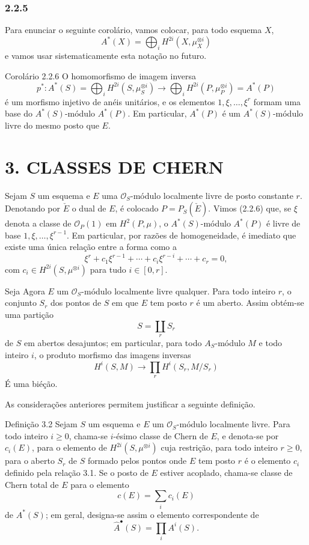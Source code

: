 \subsubsection*{2.2.5}
Para enunciar o seguinte corolário, vamos colocar, para todo esquema $X$,
\[
A^*(X)=\bigoplus_i H^{2i}(X,\mu_X^{\otimes i})
\]
e vamos usar sistematicamente esta notação no futuro.

\begin{statement}{Corolário 2.2.6}
O homomorfismo de imagem inversa
\[
p^*:A^*(S)=\bigoplus_i H^{2i}(S,\mu_S^{\otimes i})
\longrightarrow
\bigoplus_i H^{2i}(P,\mu_P^{\otimes i})=A^*(P)
\]
é um morfismo injetivo de anéis unitários, e os elementos $1,\xi,\ldots,\xi^r$ formam uma base do $A^*(S)$-módulo $A^*(P)$. Em particular, $A^*(P)$ é um $A^*(S)$-módulo livre do mesmo posto que $E$.
\end{statement}

\section*{3. CLASSES DE CHERN}

Sejam $S$ um esquema e $E$ uma $\mathcal O_S$-módulo localmente livre de posto constante $r$. Denotando por $\check E$ o dual de $E$, é colocado $P=P_S(\check E)$. Vimos (2.2.6) que, se $\xi$ denota a classe de $\mathcal O_P(1)$ em $H^2(P,\mu)$, o $A^*(S)$-módulo $A^*(P)$ é livre de base $1,\xi,\ldots,\xi^{r-1}$. Em particular, por razões de homogeneidade, é imediato que existe uma única relação entre a forma como a
\[
\xi^r+c_1\xi^{r-1}+\cdots+c_i\xi^{r-i}+\cdots+c_r=0,
\tag*{3.1.}
\]
com $c_i\in H^{2i}(S,\mu^{\otimes i})$ para tudo $i\in[0,r]$.

Seja Agora $E$ um $\mathcal O_S$-módulo localmente livre qualquer. Para todo inteiro $r$, o conjunto $S_r$ dos pontos de $S$ em que $E$ tem posto $r$ é um aberto. Assim obtém-se uma partição
\[
S=\coprod_r S_r
\]
de $S$ em abertos desajuntos; em particular, para todo $A_S$-módulo $M$ e todo inteiro $i$, o produto morfismo das imagens inversas
\[
H^i(S,M)\longrightarrow \prod_r H^i(S_r,M/S_r)
\]
É uma biéção.

As considerações anteriores permitem justificar a seguinte definição.

\begin{statement}{Definição 3.2}
Sejam $S$ um esquema e $E$ um $\mathcal O_S$-módulo localmente livre. Para todo inteiro $i\ge0$, chama-se $i$-ésimo classe de Chern de $E$, e denota-se por $c_i(E)$, para o elemento de $H^{2i}(S,\mu^{\otimes i})$ cuja restrição, para todo inteiro $r\ge0$, para o aberto $S_r$ de $S$ formado pelos pontos onde $E$ tem posto $r$ é o elemento $c_i$ definido pela relação 3.1. Se o posto de $E$ estiver acoplado, chama-se classe de Chern total de $E$ para o elemento
\[
c(E)=\sum_i c_i(E)
\]
de $A^*(S)$; em geral, designa-se assim o elemento correspondente de
\[
\widehat A^{\bullet}(S)=\prod_i A^i(S).
\]
\end{statement}
